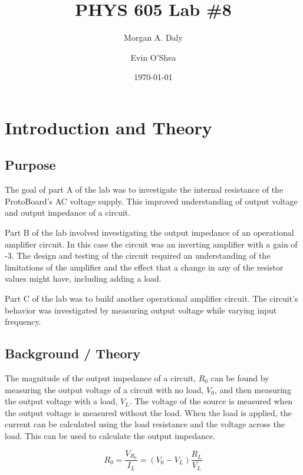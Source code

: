 \documentclass[twocolumn, amsmath]{revtex4}
\begin{document}
\title{PHYS 605 Lab \#8} 

\author{Morgan A. Daly}
\author{Evin O'Shea}
\date{\today} 


\maketitle


\section{Introduction and Theory}
\subsection{Purpose}

The goal of part A of the lab was to investigate the internal resistance of the ProtoBoard's AC voltage supply. This improved understanding of output voltage and output impedance of a circuit. 

Part B of the lab involved investigating the output impedance of an operational amplifier circuit. In this case the circuit was an inverting amplifier with a gain of -3. The design and testing of the circuit required an understanding of the limitations of the amplifier and the effect that a change in any of the resistor values might have, including adding a load.

Part C of the lab was to build another operational amplifier circuit. The circuit's behavior was investigated by measuring output voltage while varying input frequency. 

\subsection{Background / Theory}

The magnitude of the output impedance of a circuit, $R_0$ can be found by measuring the output voltage of a circuit with no load, $V_0$, and then measuring the output voltage with a load, $V_L$. 
The voltage of the source is measured when the output voltage is measured without the load. 
When the load is applied, the current can be calculated using the load resistance and the voltage across the load. This can be  used to calculate the output impedance.

\begin{equation}
R_{0} =  \frac{V_{R_{0}}}{I_{L}} = (V_{0} - V_{L})\frac{R_{L}}{V_{L}}
\end{equation}
\end{document}
